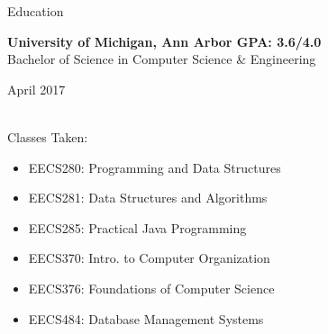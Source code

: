 \documentclass{resume} %
\begin{document}
\bigskip


\begin{rSection}{Education}

{\bf University of Michigan, Ann Arbor \hfill GPA: 3.6/4.0 \\}%
Bachelor of Science in Computer Science \& Engineering \hfill \begin{em} April 2017 \end{em}\\
Classes Taken:
\vspace{-3mm}
\begin{multicols}{2}
\begin{itemize}[noitemsep,nolistsep]
    \item EECS280: Programming and Data Structures
    \item EECS281: Data Structures and Algorithms
    \item EECS285: Practical Java Programming
    \item EECS370: Intro. to Computer Organization
    \item EECS376: Foundations of Computer Science
    \item EECS484: Database Management Systems
\end{itemize}
\end{multicols}
\vspace{-4mm}

\end{rSection}

\end{document}
